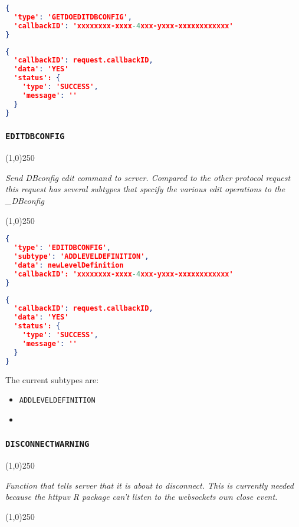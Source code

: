 \documentclass[A4,12pt, utf8]{article}
\begin{document}
\begin{lstlisting}[caption=Request content, language=json]
{
  'type': 'GETDOEDITDBCONFIG', 
  'callbackID': 'xxxxxxxx-xxxx-4xxx-yxxx-xxxxxxxxxxxx'
}
\end{lstlisting}

\begin{lstlisting}[caption=response content, language=json]
{
  'callbackID': request.callbackID,
  'data': 'YES'
  'status': {
    'type': 'SUCCESS',
    'message': ''
  }
}
\end{lstlisting}


\subsubsection{\texttt{EDITDBCONFIG}}
\label{EDITDBCONFIG}
\begin{center}
  \line(1,0){250}

  \textit{Send DBconfig edit command to server. Compared to the other protocol 
  request this request has several subtypes that specify the various edit operations
  to the \_DBconfig }

  \line(1,0){250}
\end{center}


\begin{lstlisting}[caption=Request content, language=json]
{
  'type': 'EDITDBCONFIG',
  'subtype': 'ADDLEVELDEFINITION', 
  'data': newLevelDefinition
  'callbackID': 'xxxxxxxx-xxxx-4xxx-yxxx-xxxxxxxxxxxx'
}
\end{lstlisting}

\begin{lstlisting}[caption=response content (if changes where made), language=json]
{
  'callbackID': request.callbackID,
  'data': 'YES'
  'status': {
    'type': 'SUCCESS',
    'message': ''
  }
}
\end{lstlisting}

The current subtypes are: 

\begin{itemize}
  \item \texttt{ADDLEVELDEFINITION}
  \item \texttt{}
\end{itemize}

\subsubsection{\texttt{DISCONNECTWARNING}}
\begin{center}
  \line(1,0){250}

  \textit{Function that tells server that it is about to disconnect. This is currently needed because the httpuv R package can't listen to the websockets own close event.}

  \line(1,0){250}
\end{center}
\end{document}
